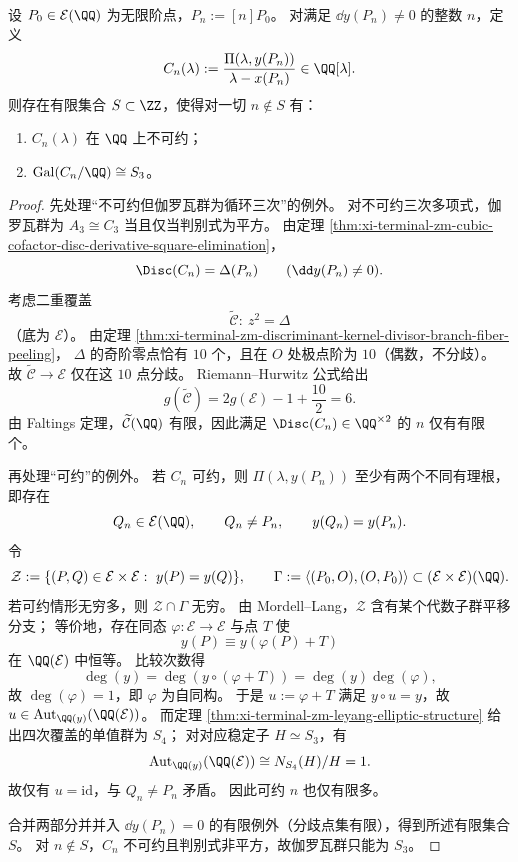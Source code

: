 \begin{theorem}\label{thm:xi-terminal-zm-cubic-cofactor-s3-rigidity-finite-exception}
设 \(P_0\in \mathcal E(\QQ)\) 为无限阶点，\(P_n:=[n]P_0\)。
对满足 \(\dd y(P_n)\neq 0\) 的整数 \(n\)，定义
\[
C_n(\lambda):=\frac{\Pi(\lambda,y(P_n))}{\lambda-x(P_n)}\in\QQ[\lambda].
\]
则存在有限集合 \(S\subset\ZZ\)，使得对一切 \(n\notin S\) 有：
\begin{enumerate}
\item \(C_n(\lambda)\) 在 \(\QQ\) 上不可约；
\item \(\operatorname{Gal}(C_n/\QQ)\cong S_3\)。
\end{enumerate}
\end{theorem}
\begin{proof}
先处理“不可约但伽罗瓦群为循环三次”的例外。
对不可约三次多项式，伽罗瓦群为 \(A_3\cong C_3\) 当且仅当判别式为平方。
由定理 \ref{thm:xi-terminal-zm-cubic-cofactor-disc-derivative-square-elimination}，
\[
\Disc(C_n)=\Delta(P_n)\qquad(\dd y(P_n)\neq 0).
\]
考虑二重覆盖
\[
\widetilde{\mathcal C}:\ z^2=\Delta
\]
（底为 \(\mathcal E\)）。
由定理 \ref{thm:xi-terminal-zm-discriminant-kernel-divisor-branch-fiber-peeling}，
\(\Delta\) 的奇阶零点恰有 \(10\) 个，且在 \(O\) 处极点阶为 \(10\)（偶数，不分歧）。
故 \(\widetilde{\mathcal C}\to \mathcal E\) 仅在这 \(10\) 点分歧。
Riemann--Hurwitz 公式给出
\[
g(\widetilde{\mathcal C})=2g(\mathcal E)-1+\frac{10}{2}=6.
\]
由 Faltings 定理，\(\widetilde{\mathcal C}(\QQ)\) 有限，因此满足 \(\Disc(C_n)\in\QQ^{\times2}\) 的 \(n\) 仅有有限个。

再处理“可约”的例外。
若 \(C_n\) 可约，则 \(\Pi(\lambda,y(P_n))\) 至少有两个不同有理根，即存在
\[
Q_n\in \mathcal E(\QQ),\qquad Q_n\neq P_n,\qquad y(Q_n)=y(P_n).
\]
令
\[
\mathcal Z:=\{(P,Q)\in \mathcal E\times \mathcal E:\ y(P)=y(Q)\},
\qquad
\Gamma:=\langle (P_0,O),(O,P_0)\rangle\subset (\mathcal E\times\mathcal E)(\QQ).
\]
若可约情形无穷多，则 \(\mathcal Z\cap\Gamma\) 无穷。
由 Mordell--Lang，\(\mathcal Z\) 含有某个代数子群平移分支；
等价地，存在同态 \(\varphi:\mathcal E\to\mathcal E\) 与点 \(T\) 使
\[
y(P)\equiv y(\varphi(P)+T)
\]
在 \(\QQ(\mathcal E)\) 中恒等。
比较次数得
\[
\deg(y)=\deg(y\circ(\varphi+T))=\deg(y)\deg(\varphi),
\]
故 \(\deg(\varphi)=1\)，即 \(\varphi\) 为自同构。
于是 \(u:=\varphi+T\) 满足 \(y\circ u=y\)，故 \(u\in \operatorname{Aut}_{\QQ(y)}(\QQ(\mathcal E))\)。
而定理 \ref{thm:xi-terminal-zm-leyang-elliptic-structure} 给出四次覆盖的单值群为 \(S_4\)；
对对应稳定子 \(H\simeq S_3\)，有
\[
\operatorname{Aut}_{\QQ(y)}(\QQ(\mathcal E))
\cong N_{S_4}(H)/H=1.
\]
故仅有 \(u=\mathrm{id}\)，与 \(Q_n\neq P_n\) 矛盾。
因此可约 \(n\) 也仅有限多。

合并两部分并并入 \(\dd y(P_n)=0\) 的有限例外（分歧点集有限），得到所述有限集合 \(S\)。
对 \(n\notin S\)，\(C_n\) 不可约且判别式非平方，故伽罗瓦群只能为 \(S_3\)。
\end{proof}

